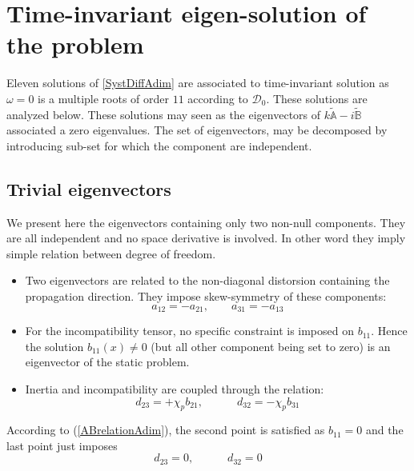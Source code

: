 \documentclass[
10pt, %
a4paper, %
oneside, %
headinclude,footinclude, %
table
]{scrartcl}
\begin{document}
\section{Time-invariant  eigen-solution of the problem}
Eleven solutions of \ref{SystDiffAdim} are associated to time-invariant solution as $\omega=0$ is a multiple roots of order $11$ according to $\mathcal{D}_{0}$. These solutions are analyzed below. These solutions may seen as the eigenvectors of $k\tilde{\mathbb{A}}-i\tilde{\mathbb{B}}$ associated a zero eigenvalues. The set of eigenvectors, may be decomposed by introducing sub-set for which the component are independent. 
\subsection{Trivial eigenvectors}
We present here the eigenvectors containing only two non-null components. They are all independent and no space derivative is involved. In other word they imply simple relation between degree of freedom. 
\begin{itemize}
\item Two eigenvectors are related to the non-diagonal distorsion containing the propagation direction. They impose skew-symmetry of these components:
$$
a_{12}=-a_{21}, \quad\quad
a_{31}=-a_{13}
$$
\item For the incompatibility tensor, no specific constraint is imposed on $b_{11}$. Hence the solution $b_{11}(x)\neq 0$ (but all other component being set to zero) is an eigenvector of the static problem. 
\item Inertia and incompatibility are coupled through the relation:
$$
d_{23}=+\chi_{p}b_{21}, \quad\quad\quad
d_{32}=-\chi_{p}b_{31}
$$
\end{itemize}
According to (\ref{ABrelationAdim}), the second point is satisfied as $b_{11}=0$ and the last point just imposes
$$
d_{23}=0, \quad\quad\quad
d_{32}=0
$$
\end{document}
